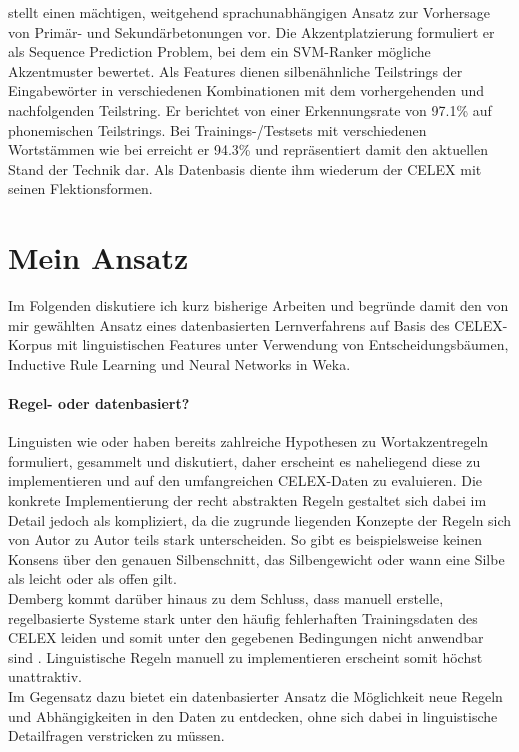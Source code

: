 
\cite{Dou&Bergsma2009} stellt einen mächtigen, weitgehend sprachunabhängigen Ansatz zur Vorhersage von Primär- und Sekundärbetonungen vor. Die Akzentplatzierung formuliert er als Sequence Prediction Problem, bei dem ein SVM-Ranker mögliche Akzentmuster bewertet. Als Features dienen silbenähnliche Teilstrings der Eingabewörter in verschiedenen Kombinationen mit dem vorhergehenden und nachfolgenden Teilstring. Er berichtet von einer Erkennungsrate von 97.1\% auf phonemischen Teilstrings. Bei Trainings-/Testsets mit verschiedenen Wortstämmen wie bei \cite{Demberg2006} erreicht er 94.3\% und repräsentiert damit den aktuellen Stand der Technik dar. Als Datenbasis diente ihm wiederum der CELEX mit seinen Flektionsformen.









\section{Mein Ansatz}

Im Folgenden diskutiere ich kurz bisherige Arbeiten und begründe damit den von mir gewählten Ansatz eines datenbasierten Lernverfahrens auf Basis des CELEX-Korpus mit linguistischen Features unter Verwendung von Entscheidungsbäumen, Inductive Rule Learning und Neural Networks in Weka.

\paragraph*{Regel- oder datenbasiert?}
Linguisten wie \cite{Fery1998} oder \cite{Jessen1999} haben bereits zahlreiche Hypothesen zu Wortakzentregeln formuliert, gesammelt und diskutiert, daher erscheint es naheliegend diese zu implementieren und auf den umfangreichen CELEX-Daten zu evaluieren. Die konkrete Implementierung der recht abstrakten Regeln gestaltet sich dabei im Detail jedoch als kompliziert, da die zugrunde liegenden Konzepte der Regeln sich von Autor zu Autor teils stark unterscheiden. So gibt es beispielsweise keinen Konsens über den genauen Silbenschnitt, das Silbengewicht oder wann eine Silbe als leicht oder als offen gilt.\\
Demberg kommt darüber hinaus zu dem Schluss, dass manuell erstelle, regelbasierte Systeme stark unter den häufig fehlerhaften Trainingsdaten des CELEX leiden und somit unter den gegebenen Bedingungen nicht anwendbar sind \cite[S.~68]{Demberg2006}. Linguistische Regeln manuell zu implementieren erscheint somit höchst unattraktiv. \\
Im Gegensatz dazu bietet ein datenbasierter Ansatz die Möglichkeit neue Regeln und Abhängigkeiten in den Daten zu entdecken, ohne sich dabei in linguistische Detailfragen verstricken zu müssen.

